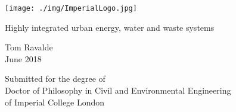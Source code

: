 \begin{titlepage}

  \texttt{[image: ./img/ImperialLogo.jpg]}\\[1cm]

    \begin{center}
        \vspace*{1cm}
        
        {\LARGE Highly integrated urban energy, water and waste systems}
        
        \vspace{1.5cm}
        
        Tom Ravalde \\
        \vspace{0.8cm}
        June 2018
        
        \vfill
        
        Submitted for the degree of \\
	Doctor of Philosophy in Civil and Environmental Engineering\\
	of Imperial College London
        
    \end{center}

\end{titlepage}

